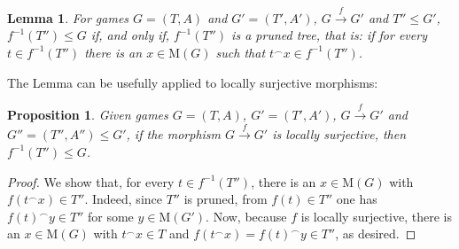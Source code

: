 \documentclass[12pt]{amsart}
\newtheorem{prop}[thm]{Proposition}
\newtheorem{lemma}[thm]{Lemma}
\theoremstyle{definition}
\newcommand{\M}{\mathrm{M}}
\begin{document}
\begin{lemma}\label{PROP_SubChar}
	For games $G=(T,A)$ and $G'=(T',A')$, $G\stackrel{f}{\to}G'$ and $T''\le G'$, $f^{-1}(T'')\le G$ if, and only if, $f^{-1}(T'')$ is a pruned tree, that is: if for every $t\in f^{-1}(T'')$ there is an $x\in \M(G)$ such that $t^\smallfrown x\in f^{-1}(T'')$.
\end{lemma}


The Lemma can be usefully applied to locally surjective morphisms: 


\begin{prop}
	Given games $G=(T,A)$, $G'=(T',A')$, $G\stackrel{f}{\to}G'$ and $G''=(T'',A'')\le G'$, if the morphism $G\stackrel{f}{\to}G'$ is locally surjective, then $f^{-1}(T'')\le G$.
\end{prop}
\begin{proof}
	We show that, for every $t\in f^{-1}(T'')$, there is an $x\in \M(G)$ with $f(t^\smallfrown x)\in T''$.
	Indeed, since $T''$ is pruned, from $f(t)\in T''$ one has $f(t)^\smallfrown y\in T''$ for some $y\in \M(G')$. Now, because $f$ is locally surjective, there is an $x\in \M(G)$ with $t^\smallfrown x\in T$ and $f(t^\smallfrown x)=f(t)^\smallfrown y\in T''$, as desired.
\end{proof}
\end{document}
